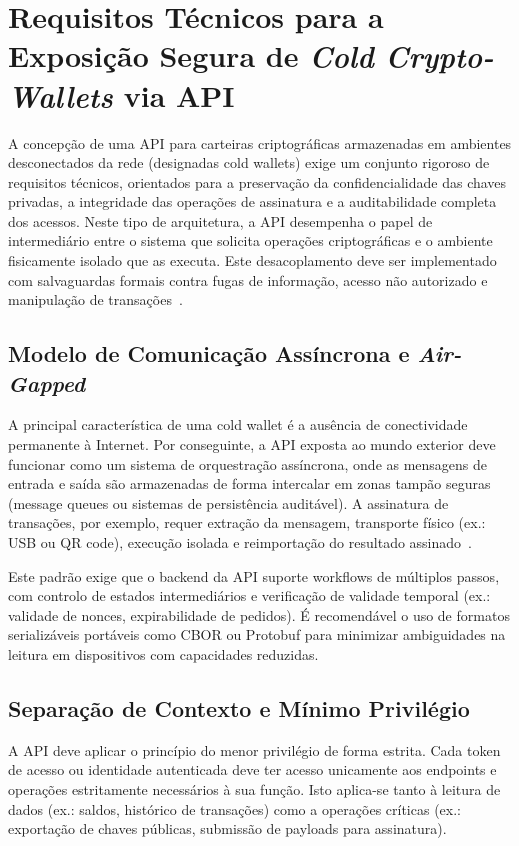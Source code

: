 \newpage
\section{Requisitos Técnicos para a Exposição Segura de \textit{Cold Crypto-Wallets} via API}
A concepção de uma API para carteiras criptográficas armazenadas em ambientes desconectados da rede (designadas cold wallets) exige um conjunto rigoroso de requisitos técnicos, orientados para a preservação da confidencialidade das chaves privadas, a integridade das operações de assinatura e a auditabilidade completa dos acessos. Neste tipo de arquitetura, a API desempenha o papel de intermediário entre o sistema que solicita operações criptográficas e o ambiente fisicamente isolado que as executa. Este desacoplamento deve ser implementado com salvaguardas formais contra fugas de informação, acesso não autorizado e manipulação de transações~\cite{bonneau2015, boneh2019, oue2019}.

\subsection{Modelo de Comunicação Assíncrona e \textit{Air-Gapped}}
A principal característica de uma cold wallet é a ausência de conectividade permanente à Internet. Por conseguinte, a API exposta ao mundo exterior deve funcionar como um sistema de orquestração assíncrona, onde as mensagens de entrada e saída são armazenadas de forma intercalar em zonas tampão seguras (message queues ou sistemas de persistência auditável). A assinatura de transações, por exemplo, requer extração da mensagem, transporte físico (ex.: USB ou QR code), execução isolada e reimportação do resultado assinado~\cite{gudgeon2020}.

Este padrão exige que o backend da API suporte workflows de múltiplos passos, com controlo de estados intermediários e verificação de validade temporal (ex.: validade de nonces, expirabilidade de pedidos). É recomendável o uso de formatos serializáveis portáveis como CBOR ou Protobuf para minimizar ambiguidades na leitura em dispositivos com capacidades reduzidas.

\subsection{Separação de Contexto e Mínimo Privilégio}
A API deve aplicar o princípio do menor privilégio de forma estrita. Cada token de acesso ou identidade autenticada deve ter acesso unicamente aos endpoints e operações estritamente necessários à sua função. Isto aplica-se tanto à leitura de dados (ex.: saldos, histórico de transações) como a operações críticas (ex.: exportação de chaves públicas, submissão de payloads para assinatura).

